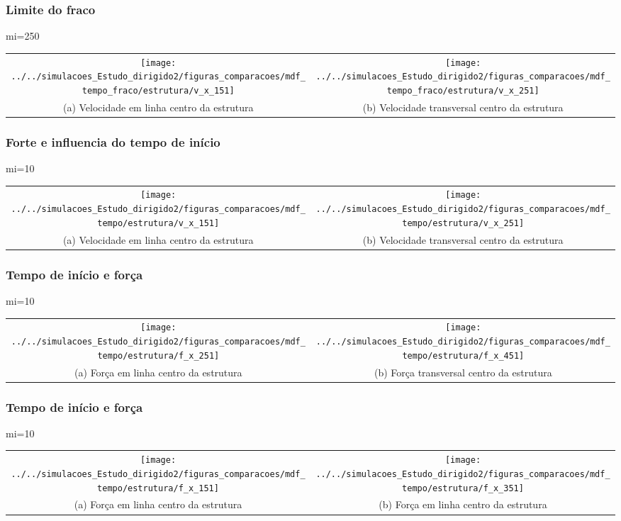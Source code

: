 \documentclass[xcolor=dvipsnames,10pt,aspectratio=169]{beamer}
\begin{document}
		\begin{frame}
		\frametitle{Limite do fraco}
			mi=250
			\begin{tabular}{c c}
				{\texttt{[image: ../../simulacoes\_Estudo\_dirigido2/figuras\_comparacoes/mdf\_tempo\_fraco/estrutura/v\_x\_151]}}&{\texttt{[image: ../../simulacoes\_Estudo\_dirigido2/figuras\_comparacoes/mdf\_tempo\_fraco/estrutura/v\_x\_251]}}\\
				{(a) Velocidade em linha centro da estrutura} & {(b) Velocidade transversal centro da estrutura}
			\end{tabular}
		\end{frame}
		
		
		\begin{frame}
			\frametitle{Forte e influencia do tempo de início}
			mi=10
			\begin{tabular}{c c}
				{\texttt{[image: ../../simulacoes\_Estudo\_dirigido2/figuras\_comparacoes/mdf\_tempo/estrutura/v\_x\_151]}}&{\texttt{[image: ../../simulacoes\_Estudo\_dirigido2/figuras\_comparacoes/mdf\_tempo/estrutura/v\_x\_251]}}\\
				{(a) Velocidade em linha centro da estrutura} & {(b) Velocidade transversal centro da estrutura}
			\end{tabular}
		\end{frame}
	
		\begin{frame}
			\frametitle{Tempo de início e força}
			mi=10
			\begin{tabular}{c c}
				{\texttt{[image: ../../simulacoes\_Estudo\_dirigido2/figuras\_comparacoes/mdf\_tempo/estrutura/f\_x\_251]}}&{\texttt{[image: ../../simulacoes\_Estudo\_dirigido2/figuras\_comparacoes/mdf\_tempo/estrutura/f\_x\_451]}}\\
				{(a) Força em linha centro da estrutura} & {(b) Força transversal centro da estrutura}
			\end{tabular}
		\end{frame}
	
		\begin{frame}
			\frametitle{Tempo de início e força}
			mi=10
			\begin{tabular}{c c}
				{\texttt{[image: ../../simulacoes\_Estudo\_dirigido2/figuras\_comparacoes/mdf\_tempo/estrutura/f\_x\_151]}}&{\texttt{[image: ../../simulacoes\_Estudo\_dirigido2/figuras\_comparacoes/mdf\_tempo/estrutura/f\_x\_351]}}\\
				{(a) Força em linha centro da estrutura} & {(b) Força em linha centro da estrutura}
			\end{tabular}
		\end{frame}
		
\end{document}
